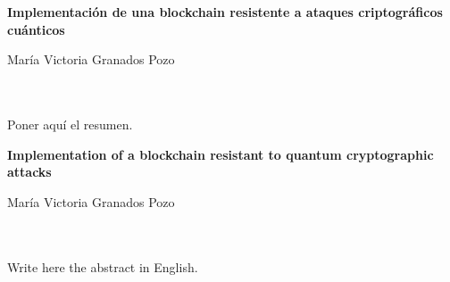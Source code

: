 \chapter*{}






\cleardoublepage
\thispagestyle{empty}

\begin{center}
{\large\bfseries Implementación de una blockchain resistente a ataques criptográficos cuánticos}\\
\end{center}
\begin{center}
María Victoria Granados Pozo\\
\end{center}

\\

\vspace{0.7cm}
\\

Poner aquí el resumen.
\cleardoublepage


\thispagestyle{empty}


\begin{center}
{\large\bfseries Implementation of a blockchain resistant to quantum cryptographic attacks}\\
\end{center}
\begin{center}
María Victoria Granados Pozo\\
\end{center}

\\

\vspace{0.7cm}
\\

Write here the abstract in English.

\chapter*{}
\thispagestyle{empty}

